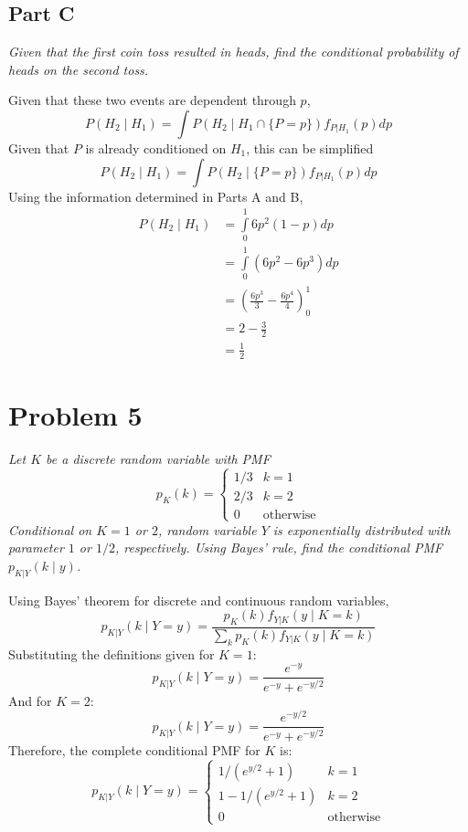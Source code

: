 \documentclass{article}
\begin{document}
\subsection*{Part C}

\textit{Given that the first coin toss resulted in heads, find the
conditional probability of heads on the second toss.}

\bigbreak

Given that these two events are dependent through $p$,
$$ P(H_2 \mid H_1) = \int P(H_2 \mid H_1 \cap \{P = p\}) f_{P|H_1}(p) dp $$
Given that $P$ is already conditioned on $H_1$, this can be simplified
$$ P(H_2 \mid H_1) = \int P(H_2 \mid \{P = p\}) f_{P|H_1}(p) dp $$
Using the information determined in Parts A and B,
\begin{align*}
    P(H_2 \mid H_1) &= \int\limits_0^1 6 p^2 (1 - p) dp \\
    &= \int\limits_0^1 \left(6 p^2 - 6p^3\right) dp \\
    &= \left(\frac{6 p^3}{3} - \frac{6 p^4}{4} \right)_0^1 \\
    &= 2 - \frac{3}{2} \\
    &= \frac{1}{2}
\end{align*}

\section*{Problem 5}

\textit{Let $K$ be a discrete random variable with PMF}
$$ p_K(k) = \begin{cases}
    1/3 & k = 1 \\
    2/3 & k = 2 \\
    0 & \mathrm{otherwise}
\end{cases} $$
\textit{Conditional on $K = 1$ or $2$, random variable $Y$ is exponentially
distributed with parameter $1$ or $1/2$, respectively. Using Bayes' rule,
find the conditional PMF $p_{K|Y}(k \mid y)$.}

\bigbreak

Using Bayes' theorem for discrete and continuous random variables,
$$ p_{K|Y}(k \mid Y = y) = \frac{p_K(k) f_{Y|K}(y \mid K = k)}{\sum_k p_K(k)
f_{Y|K}(y \mid K = k)} $$
Substituting the definitions given for $K = 1$:
$$ p_{K|Y}(k \mid Y = y) = \frac{e^{-y}}{e^{-y} + e^{-y / 2}} $$
And for $K = 2$:
$$ p_{K|Y}(k \mid Y = y) = \frac{e^{-y / 2}}{e^{-y} + e^{-y / 2}} $$
Therefore, the complete conditional PMF for $K$ is:
$$ p_{K|Y}(k \mid Y = y) = \begin{cases}
    1 / (e^{y / 2} + 1) & k = 1 \\
    1 - 1 / (e^{y / 2} + 1) & k = 2 \\
    0 & \mathrm{otherwise}
\end{cases} $$
\end{document}
